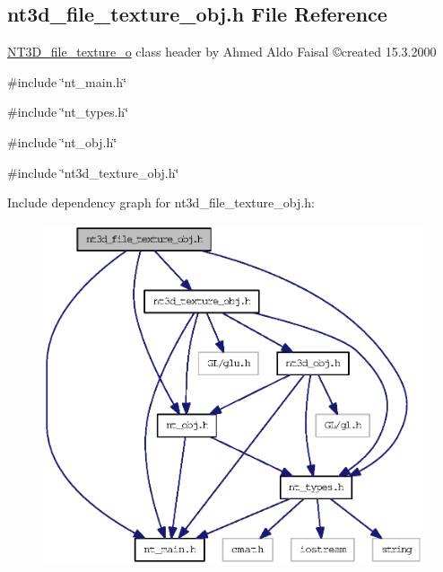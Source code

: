 \subsection{nt3d\_\-file\_\-texture\_\-obj.h File Reference}
\label{nt3d__file__texture__obj_8h}



\begin{DoxyItemize}
\item \hyperlink{class_n_t3_d__file__texture__o}{NT3D\_\-file\_\-texture\_\-o} class header by Ahmed Aldo Faisal \copyright created 15.3.2000 
\end{DoxyItemize} 


{\ttfamily \#include \char`\"{}nt\_\-main.h\char`\"{}}\par
{\ttfamily \#include \char`\"{}nt\_\-types.h\char`\"{}}\par
{\ttfamily \#include \char`\"{}nt\_\-obj.h\char`\"{}}\par
{\ttfamily \#include \char`\"{}nt3d\_\-texture\_\-obj.h\char`\"{}}\par
Include dependency graph for nt3d\_\-file\_\-texture\_\-obj.h:
\nopagebreak
\begin{figure}[H]
\begin{center}
\leavevmode
\includegraphics[width=393pt]{nt3d__file__texture__obj_8h__incl}
\end{center}
\end{figure}
